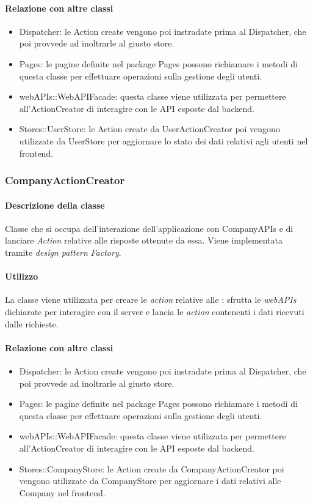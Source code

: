 \paragraph*{Relazione con altre classi}
\begin{itemize}
\item Dispatcher: le Action create vengono poi instradate prima al Dispatcher, che poi provvede ad inoltrarle al giusto store.
\item Pages: le pagine definite nel package Pages possono richiamare i metodi di questa classe per effettuare operazioni sulla gestione degli utenti.
\item webAPIs::WebAPIFacade: questa classe viene utilizzata per permettere all'ActionCreator di interagire con le API esposte dal backend.
\item Stores::UserStore: le Action create da UserActionCreator poi vengono utilizzate da UserStore per aggiornare lo stato dei dati relativi agli utenti nel frontend.
\end{itemize}

\subsubsection{CompanyActionCreator}
\paragraph*{Descrizione della classe}
Classe che si occupa dell'interazione dell'applicazione con CompanyAPIs e di lanciare \textit{Action} relative alle risposte ottenute da essa. Viene implementata tramite \textit{design pattern} \textit{Factory}.
\paragraph*{Utilizzo}
La classe viene utilizzata per creare le \textit{action} relative alle : sfrutta le \textit{webAPIs} dichiarate per interagire con il server e lancia le \textit{action} contenenti i dati ricevuti dalle  richieste.

\paragraph*{Relazione con altre classi}
\begin{itemize}
\item Dispatcher: le Action create vengono poi instradate prima al Dispatcher, che poi provvede ad inoltrarle al giusto store.
\item Pages: le pagine definite nel package Pages possono richiamare i metodi di questa classe per effettuare operazioni sulla gestione degli utenti.
\item webAPIs::WebAPIFacade: questa classe viene utilizzata per permettere all'ActionCreator di interagire con le API esposte dal backend.
\item Stores::CompanyStore: le Action create da CompanyActionCreator poi vengono utilizzate da CompanyStore per aggiornare i dati relativi alle Company nel frontend.
\end{itemize}

